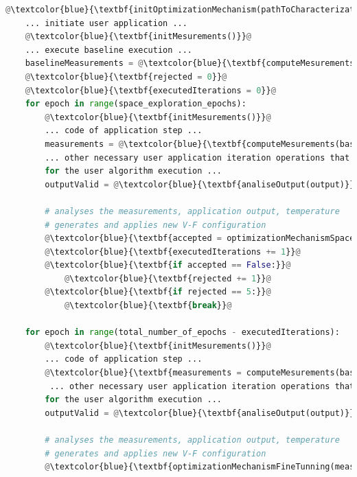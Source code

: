 \begin{lstlisting}[language=Python, caption=Example of usage of V-F Optimization Mechanism Library. Blue statements represents the added programming elements for the mechanism, label=lst:wrapper, basicstyle=\footnotesize\ttfamily,abovecaptionskip=0pt, captionpos=b,escapechar=@]
    @\textcolor{blue}{\textbf{initOptimizationMechanism(pathToCharacterizationResults)}}@
    ... initiate user application ...
    @\textcolor{blue}{\textbf{initMesurements()}}@
    ... execute baseline execution ...
    baselineMeasurements = @\textcolor{blue}{\textbf{computeMesurements()}}@
    @\textcolor{blue}{\textbf{rejected = 0}}@
    @\textcolor{blue}{\textbf{executedIterations = 0}}@
    for epoch in range(space_exploration_epochs):
        @\textcolor{blue}{\textbf{initMesurements()}}@
        ... code of application step ...
        measurements = @\textcolor{blue}{\textbf{computeMesurements(baselineMeasurements)}}@
        ... other necessary user application iteration operations that do not account
        for the user algorithm execution ...
        outputValid = @\textcolor{blue}{\textbf{analiseOutput(output)}}@
        
        # analyses the measurements, application output, temperature
        # generates and applies new V-F configuration
        @\textcolor{blue}{\textbf{accepted = optimizationMechanismSpaceExploration(measurements, outputValid)}}@
        @\textcolor{blue}{\textbf{executedIterations += 1}}@
        @\textcolor{blue}{\textbf{if accepted == False:}}@
            @\textcolor{blue}{\textbf{rejected += 1}}@
        @\textcolor{blue}{\textbf{if rejected == 5:}}@
            @\textcolor{blue}{\textbf{break}}@
    
    for epoch in range(total_number_of_epochs - executedIterations):
        @\textcolor{blue}{\textbf{initMesurements()}}@
        ... code of application step ...
        @\textcolor{blue}{\textbf{measurements = computeMesurements(baselineMeasurements)}}@
         ... other necessary user application iteration operations that do not account
        for the user algorithm execution ...
        outputValid = @\textcolor{blue}{\textbf{analiseOutput(output)}}@
        
        # analyses the measurements, application output, temperature
        # generates and applies new V-F configuration
        @\textcolor{blue}{\textbf{optimizationMechanismFineTunning(measurements, outputValid)}}@
\end{lstlisting}





